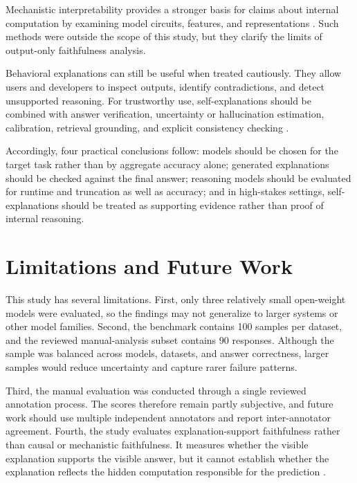 \documentclass{article}
\begin{document}
Mechanistic interpretability provides a stronger basis for claims about
internal computation by examining model circuits, features, and
representations
\cite{elhage2021framework,bricken2023monosemanticity,
cunningham2024sparse,rai2024practical}. Such methods were outside the
scope of this study, but they clarify the limits of output-only
faithfulness analysis.

Behavioral explanations can still be useful when treated cautiously.
They allow users and developers to inspect outputs, identify
contradictions, and detect unsupported reasoning. For trustworthy use,
self-explanations should be combined with answer verification,
uncertainty or hallucination estimation, calibration, retrieval
grounding, and explicit consistency checking
\cite{weng2023selfverification,manakul2023selfcheckgpt,
farquhar2024semantic,desai2020calibration,sui2025fidelis}.

Accordingly, four practical conclusions follow: models should be chosen
for the target task rather than by aggregate accuracy alone; generated
explanations should be checked against the final answer; reasoning
models should be evaluated for runtime and truncation as well as
accuracy; and in high-stakes settings, self-explanations should be
treated as supporting evidence rather than proof of internal reasoning.


\section{Limitations and Future Work}

This study has several limitations. First, only three relatively small
open-weight models were evaluated, so the findings may not generalize to
larger systems or other model families. Second, the benchmark contains
100 samples per dataset, and the reviewed manual-analysis subset contains
90 responses. Although the sample was balanced across models, datasets,
and answer correctness, larger samples would reduce uncertainty and
capture rarer failure patterns.

Third, the manual evaluation was conducted through a single reviewed
annotation process. The scores therefore remain partly subjective, and
future work should use multiple independent annotators and report
inter-annotator agreement. Fourth, the study evaluates
explanation-support faithfulness rather than causal or mechanistic
faithfulness. It measures whether the visible explanation supports the
visible answer, but it cannot establish whether the explanation reflects
the hidden computation responsible for the prediction
\cite{lanham2023measuring,zaman2025causal,
elhage2021framework,rai2024practical}.
\end{document}
